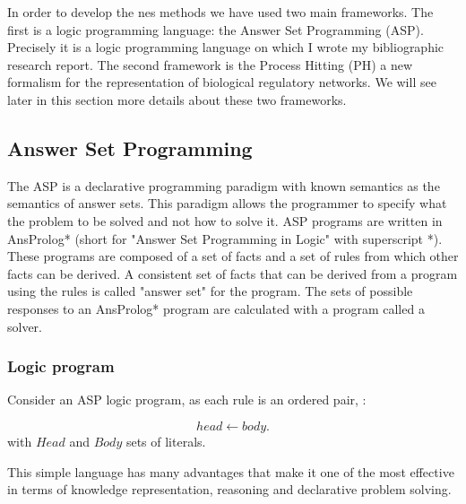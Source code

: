In order to develop the nes methods we have used two main frameworks. The first is a logic programming language: the Answer Set Programming (ASP). Precisely it is a logic programming language on which I wrote my bibliographic research report. The second framework is the Process Hitting (PH) a new formalism for the representation of biological regulatory networks. We will see later in this section more details about these two frameworks.

\subsection{Answer Set Programming }

The ASP is a declarative programming paradigm with known semantics as the semantics of answer sets. This paradigm allows the programmer to specify what the problem to be solved and not how to solve it.
ASP programs are written in AnsProlog* (short for "Answer Set Programming in Logic" with superscript *). These programs are composed of a set of facts and a set of rules from which other facts can be derived. A consistent set of facts that can be derived from a program using the rules is called "answer set" for the program. The sets of possible responses to an AnsProlog* program are calculated with a program called a solver.

\subsubsection{Logic program}
Consider an ASP logic program, as each rule is an ordered pair,\cite{baral2003knowledge} :

\begin{equation} \label{eq1ASP}
head \leftarrow body.
\end{equation}
with $Head$ and $Body$ sets of literals. 

This simple language has many advantages that make it one of the most effective in terms of knowledge representation, reasoning and declarative problem solving. 

